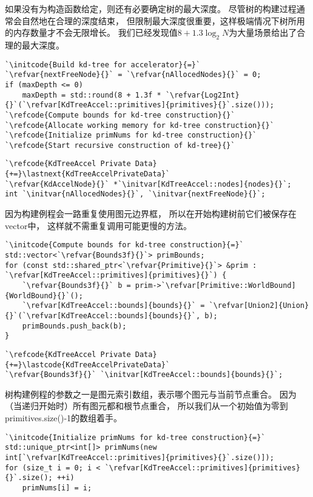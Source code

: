 如果没有为构造函数给定，则还有必要确定树的最大深度。
尽管树的构建过程通常会自然地在合理的深度结束，
但限制最大深度很重要，这样极端情况下树所用的内存数量才不会无限增长。
我们已经发现值$8+1.3\log_2N$为大量场景给出了合理的最大深度。

\begin{lstlisting}
`\initcode{Build kd-tree for accelerator}{=}`
`\refvar{nextFreeNode}{}` = `\refvar{nAllocedNodes}{}` = 0;
if (maxDepth <= 0)
    maxDepth = std::round(8 + 1.3f * `\refvar{Log2Int}{}`(`\refvar[KdTreeAccel::primitives]{primitives}{}`.size()));
`\refcode{Compute bounds for kd-tree construction}{}`
`\refcode{Allocate working memory for kd-tree construction}{}`
`\refcode{Initialize primNums for kd-tree construction}{}`
`\refcode{Start recursive construction of kd-tree}{}`
\end{lstlisting}

\begin{lstlisting}
`\refcode{KdTreeAccel Private Data}{+=}\lastnext{KdTreeAccelPrivateData}`
`\refvar{KdAccelNode}{}` *`\initvar[KdTreeAccel::nodes]{nodes}{}`;
int `\initvar{nAllocedNodes}{}`, `\initvar{nextFreeNode}{}`;
\end{lstlisting}

因为构建例程会一路重复使用图元边界框，
所以在开始构建树前它们被保存在{\ttfamily vector}中，
这样就不需重复调用可能更慢的方法。
\begin{lstlisting}
`\initcode{Compute bounds for kd-tree construction}{=}`
std::vector<`\refvar{Bounds3f}{}`> primBounds;
for (const std::shared_ptr<`\refvar{Primitive}{}`> &prim : `\refvar[KdTreeAccel::primitives]{primitives}{}`) {
    `\refvar{Bounds3f}{}` b = prim->`\refvar[Primitive::WorldBound]{WorldBound}{}`();
    `\refvar[KdTreeAccel::bounds]{bounds}{}` = `\refvar[Union2]{Union}{}`(`\refvar[KdTreeAccel::bounds]{bounds}{}`, b);
    primBounds.push_back(b);
}
\end{lstlisting}

\begin{lstlisting}
`\refcode{KdTreeAccel Private Data}{+=}\lastcode{KdTreeAccelPrivateData}`
`\refvar{Bounds3f}{}` `\initvar[KdTreeAccel::bounds]{bounds}{}`;
\end{lstlisting}

树构建例程的参数之一是图元索引数组，表示哪个图元与当前节点重合。
因为（当递归开始时）所有图元都和根节点重合，
所以我们从一个初始值为零到{\ttfamily primitives.size()-1}的数组着手。
\begin{lstlisting}
`\initcode{Initialize primNums for kd-tree construction}{=}`
std::unique_ptr<int[]> primNums(new int[`\refvar[KdTreeAccel::primitives]{primitives}{}`.size()]);
for (size_t i = 0; i < `\refvar[KdTreeAccel::primitives]{primitives}{}`.size(); ++i)
    primNums[i] = i;
\end{lstlisting}

